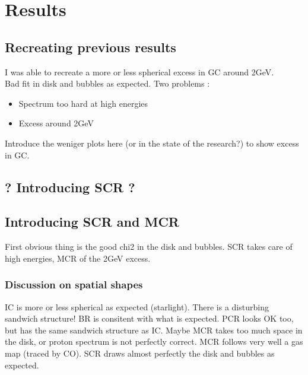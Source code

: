\chapter{Results}
\label{ch:results}
%

\section{Recreating previous results}

I was able to recreate a more or less spherical excess in GC around 2GeV.\\
Bad fit in disk and bubbles as expected.
Two problems :
\begin{itemize}
\item Spectrum too hard at high energies
\item Excess around 2GeV
\end{itemize}

Introduce the weniger plots here (or in the state of the research?) to show excess in GC.

\section{? Introducing SCR ?}


\section{Introducing SCR and MCR}

First obvious thing is the good chi2 in the disk and bubbles. SCR takes care of high energies, MCR of the 2GeV excess.\\

\subsection{Discussion on spatial shapes}
IC is more or less spherical as expected (starlight). There is a disturbing sandwich structure!
BR is consitent with what is expected.
PCR looks OK too, but has the same sandwich structure as IC. Maybe MCR takes too much space in the disk, or proton spectrum is not perfectly correct.
MCR follows very well a gas map (traced by CO).
SCR draws almost perfectly the disk and bubbles as expected.


